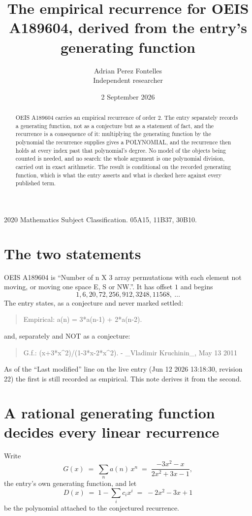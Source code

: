 \documentclass[11pt,a4paper]{article}
\title{The empirical recurrence for OEIS A189604, derived from the entry's generating function}
\author{Adrian Perez Fontelles\\ \small Independent researcher}
\date{2 September 2026}
\theoremstyle{plain}
\theoremstyle{definition}
\begin{document}
\maketitle

\begin{abstract}
OEIS A189604 carries an empirical recurrence of order $2$. The entry separately records a
generating function, not as a conjecture but as a statement of fact, and the recurrence is a
consequence of it: multiplying the generating function by the polynomial the recurrence
supplies gives a POLYNOMIAL, and the recurrence then holds at every index past that
polynomial's degree. No model of the objects being counted is needed, and no search: the
whole argument is one polynomial division, carried out in exact arithmetic. The result is
conditional on the recorded generating function, which is what the entry asserts and what is
checked here against every published term.
\end{abstract}

\noindent\small 2020 Mathematics Subject Classification. 05A15, 11B37, 30B10.\normalsize

\section{The two statements}

OEIS A189604 is ``Number of n X 3 array permutations with each element not moving, or moving one space E, S or NW.''. It has offset $1$ and begins
\[
1, 6, 20, 72, 256, 912, 3248, 11568,\ \dots
\]
The entry states, as a conjecture and never marked settled:
\begin{quote}
Empirical: a(n) = 3*a(n-1) + 2*a(n-2).
\end{quote}
and, separately and NOT as a conjecture:
\begin{quote}
G.f.: (x+3*x\^{}2)/(1-3*x-2*x\^{}2). - \_Vladimir Kruchinin\_, May 13 2011
\end{quote}
As of the ``Last modified'' line on the live entry (Jun 12 2026 13:18:30, revision 22) the first is still
recorded as empirical. This note derives it from the second.

\section{A rational generating function decides every linear recurrence}

Write
\[
G(x)\;=\;\sum_{n}a(n)\,x^{n}\;=\;\frac{- 3 x^{2} - x}{2 x^{2} + 3 x - 1},
\]
the entry's own generating function, and let
\[
D(x)\;=\;1-\sum_i c_i x^{i}\;=\;- 2 x^{2} - 3 x + 1
\]
be the polynomial attached to the conjectured recurrence.
\end{document}
